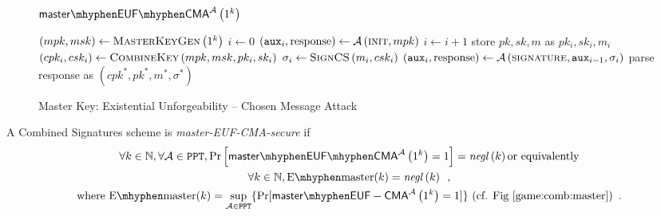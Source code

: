   \begin{figure}[!htbp]
    \begin{gamebox}{$\mathsf{master \mhyphen EUF \mhyphen
    CMA}^{\adversary}\left(1^k\right)$}
      \begin{algorithmic}[1]
        \State $\left(mpk, msk\right) \gets
        \textsc{MasterKeyGen}\left(1^k\right)$
        \State $i \gets 0$
        \State $\left(\mathtt{aux}_i, \mathrm{response}\right) \gets
        \mathcal{A}\left(\textsc{init}, mpk\right)$
          \State $i \gets i + 1$
          \State store $pk, sk, m$ as $pk_i, sk_i, m_i$
          \State $\left(cpk_i, csk_i\right) \gets
          \textsc{CombineKey}\left(mpk, msk, pk_i, sk_i\right)$
          \State $\sigma_i \gets \textsc{SignCS}\left(m_i, csk_i\right)$
          \State $\left(\mathtt{aux}_i, \mathrm{response}\right) \gets
          \mathcal{A}\left(\textsc{signature}, \mathtt{aux}_{i-1},
          \sigma_i\right)$
        \EndWhile
        \State parse response as $\left(cpk^*, pk^*, m^*, \sigma^*\right)$
          \State {}
        \Else
          \State {}
        \EndIf
      \end{algorithmic}
    \end{gamebox}
    \caption{Master Key: Existential Unforgeability -- Chosen Message Attack}
    \label{game:comb:master}
  \end{figure}
  \begin{definition}
    \label{def:master:secure}
    A Combined Signatures scheme is \emph{\textsf{master-EUF-CMA}-secure} if
    \begin{gather*}
      \forall k \in \mathbb{N}, \forall \adversary \in \mathtt{PPT},
      \Pr\left[\mathsf{master \mhyphen EUF \mhyphen
      CMA}^{\adversary}\left(1^k\right) = 1\right] =
      \mathit{negl}\left(k\right) \text{or equivalently} \\
      \forall k \in \mathbb{N}, \mathrm{E \mhyphen master}(k) =
      \mathit{negl}\left(k\right) \enspace, \\
      \text{where } \mathrm{E \mhyphen master}(k) = \underset{\adversary \in
      \mathtt{PPT}}{\sup}\{\Pr[\mathsf{master \mhyphen
      EUF-CMA}^{\adversary}\left(1^k\right) = 1]\} \text{ (cf.
      Fig~\ref{game:comb:master})} \enspace.
    \end{gather*}
  \end{definition}

